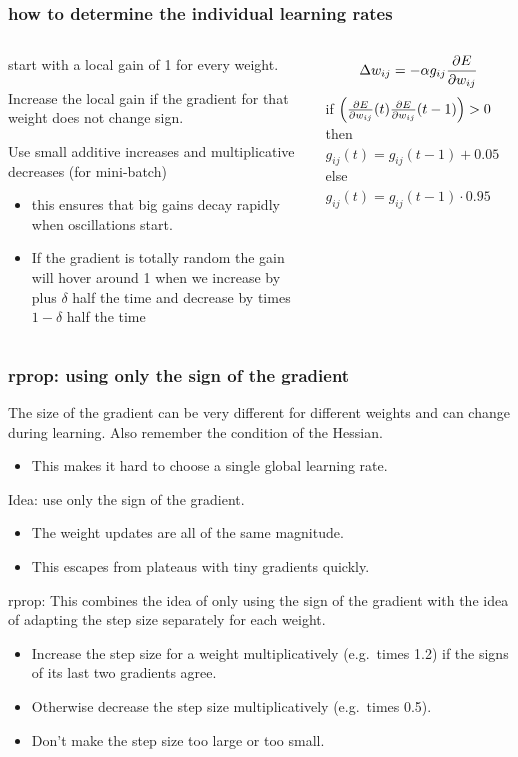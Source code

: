 \documentclass[USenglish,pdftex,compress,10pt,svgnamesi,handout]{beamer}
\begin{document}
\begin{frame}
\frametitle{how to determine the individual learning rates}
\begin{columns}
\begin{column}{6cm}
start with a local gain of 1 for every weight.

Increase the local gain if the gradient for
that weight does not change sign.

Use small additive increases and multiplicative decreases (for mini-batch)
\begin{itemize}
\item  this ensures that big gains decay rapidly when oscillations  start.
\item If the gradient is totally random the gain will hover around 1 when we increase by plus $\delta$ half the time and decrease by times $1-\delta$ half the time
\end{itemize}
\end{column}
\begin{column}{5cm}
$$\Delta w_{ij} = -\alpha g_{ij} {\partial E\over \partial w_{ij}}
$$
if $\Bigl(  {\partial E\over \partial w_{ij}}(t)  {\partial E\over \partial w_{ij}}(t-1) \Bigr) > 0$
\vskip5mm
then $g_{ij}(t) = g_{ij} (t-1) + 0.05$
\vskip5mm
else $g_{ij}(t) = g_{ij} (t-1) \cdot 0.95$
\end{column}
\end{columns}
\end{frame}







\begin{frame}
\frametitle{rprop: using only the sign of the gradient}
The size of the gradient can be very different for different weights and can change during learning.  Also remember the condition of the Hessian.
\begin{itemize}
\item  This makes it hard to choose a single global learning rate.
\end{itemize}
Idea: use only the sign of the gradient.
\begin{itemize}
\item  The weight updates are all of the same magnitude.
\item This escapes from plateaus with tiny gradients quickly.
\end{itemize}
\pause
rprop: This combines the idea of only using the sign of the gradient with the idea of adapting the step size separately for each weight.
\begin{itemize}
\item  Increase the step size for a weight multiplicatively (e.g.\ times 1.2) if the signs of its last two gradients agree.
\item Otherwise decrease the step size multiplicatively (e.g.\ times 0.5).
\item Don't make the step size too large or too small.
\end{itemize}
\end{frame}
\end{document}
